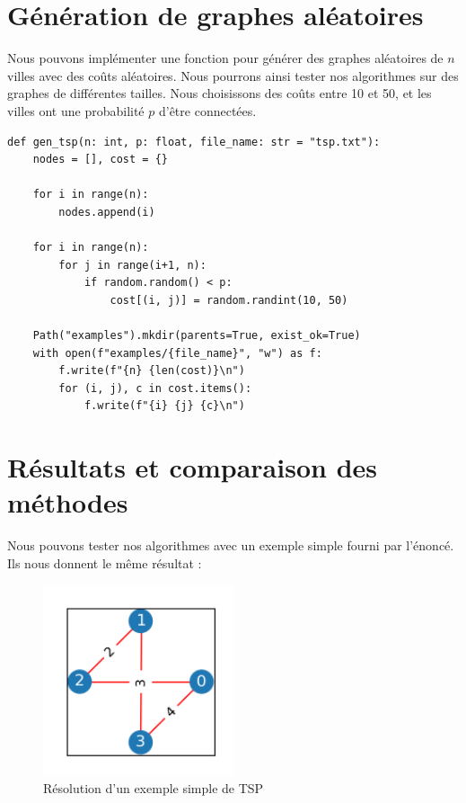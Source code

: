 \section{Génération de graphes aléatoires}

Nous pouvons implémenter une fonction pour générer des graphes aléatoires de $n$ villes avec des coûts aléatoires. Nous pourrons ainsi tester nos algorithmes sur des graphes de différentes tailles.
Nous choisissons des coûts entre 10 et 50, et les villes ont une probabilité $p$ d'être connectées.

\begin{verbatim}
def gen_tsp(n: int, p: float, file_name: str = "tsp.txt"):
    nodes = [], cost = {}

    for i in range(n):
        nodes.append(i)

    for i in range(n):
        for j in range(i+1, n):
            if random.random() < p:
                cost[(i, j)] = random.randint(10, 50)
                       
    Path("examples").mkdir(parents=True, exist_ok=True)
    with open(f"examples/{file_name}", "w") as f:
        f.write(f"{n} {len(cost)}\n")
        for (i, j), c in cost.items():
            f.write(f"{i} {j} {c}\n")
\end{verbatim}

\section{Résultats et comparaison des méthodes}

Nous pouvons tester nos algorithmes avec un exemple simple fourni par l'énoncé. Ils nous donnent le même résultat :

\begin{figure}[H]
    \centering
    \includegraphics[width=0.5\textwidth]{resources/resol_tsp.png}
    \caption{Résolution d'un exemple simple de TSP}
    \label{fig:resol_bruteforce}
\end{figure}

